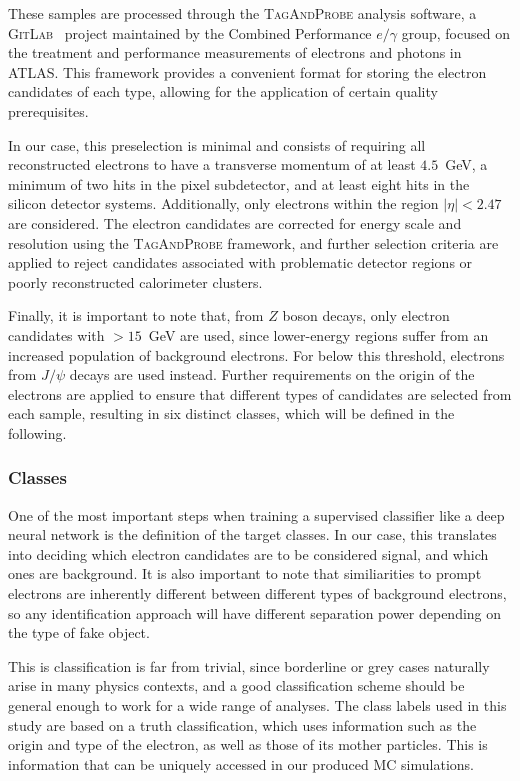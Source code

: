 These samples are processed through the \textsc{TagAndProbe} analysis software, a \textsc{GitLab}~\cite{tagandprobe} project maintained by the Combined Performance $e/\gamma$ group, focused on the treatment and performance measurements of electrons and photons in ATLAS. This framework provides a convenient format for storing the electron candidates of each type, allowing for the application of certain quality prerequisites.

In our case, this preselection is minimal and consists of requiring all reconstructed electrons to have a transverse momentum of at least $4.5$~GeV, a minimum of two hits in the pixel subdetector, and at least eight hits in the silicon detector systems. Additionally, only electrons within the region $|\eta| < 2.47$ are considered. The electron candidates are corrected for energy scale and resolution using the \textsc{TagAndProbe} framework, and further selection criteria are applied to reject candidates associated with problematic detector regions or poorly reconstructed calorimeter clusters.

Finally, it is important to note that, from $Z$ boson decays, only electron candidates with \pt$>15$~GeV are used, since lower-energy regions suffer from an increased population of background electrons. For \pt below this threshold, electrons from $J/\psi$ decays are used instead. Further requirements on the origin of the electrons are applied to ensure that different types of candidates are selected from each sample, resulting in six distinct classes, which will be defined in the following.

\subsubsection{Classes}

One of the most important steps when training a supervised classifier like a deep neural network is the definition of the target classes. In our case, this translates into deciding which electron candidates are to be considered signal, and which ones are background. It is also important to note that similiarities to prompt electrons are inherently different between different types of background electrons, so any identification approach will have different separation power depending on the type of fake object. 

This is classification is far from trivial, since borderline or grey cases naturally arise in many physics contexts, and a good classification scheme should be general enough to work for a wide range of analyses.
The class labels used in this study are based on a truth classification, which uses information such as the origin and type of the electron, as well as those of its mother particles. This is information that can be uniquely accessed in our produced MC simulations.

